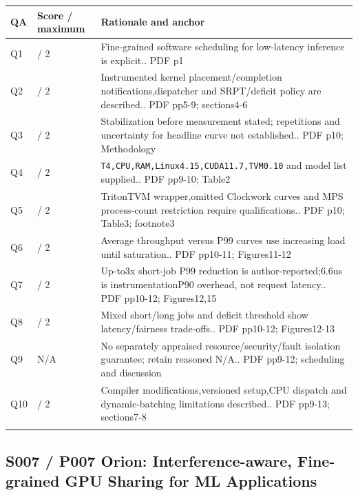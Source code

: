 \begin{longtable}{>{\raggedright\arraybackslash}p{}>{\raggedright\arraybackslash}p{}>{\raggedright\arraybackslash}p{}}
\toprule
\textbf{QA} & \textbf{Score / maximum} & \textbf{Rationale and anchor}\\\midrule\endhead
Q1 & 2 / 2 & Fine-grained software scheduling for low-latency inference is explicit.. PDF p1\\\addlinespace
Q2 & 2 / 2 & Instrumented kernel placement/completion notifications,dispatcher and SRPT/deficit policy are described.. PDF pp5-9; sections4-6\\\addlinespace
Q3 & 1 / 2 & Stabilization before measurement stated; repetitions and uncertainty for headline curve not established.. PDF p10; Methodology\\\addlinespace
Q4 & 2 / 2 & \nolinkurl{T4,CPU,RAM,Linux4.15,CUDA11.7,TVM0.10} and model list supplied.. PDF pp9-10; Table2\\\addlinespace
Q5 & 1 / 2 & TritonTVM wrapper,omitted Clockwork curves and MPS process-count restriction require qualifications.. PDF p10; Table3; footnote3\\\addlinespace
Q6 & 2 / 2 & Average throughput versus P99 curves use increasing load until saturation.. PDF pp10-11; Figures11-12\\\addlinespace
Q7 & 2 / 2 & Up-to3x short-job P99 reduction is author-reported;6.6us is instrumentationP90 overhead, not request latency.. PDF pp10-12; Figures12,15\\\addlinespace
Q8 & 2 / 2 & Mixed short/long jobs and deficit threshold show latency/fairness trade-offs.. PDF pp10-12; Figures12-13\\\addlinespace
Q9 & N/A & No separately appraised resource/security/fault isolation guarantee; retain reasoned N/A.. PDF pp9-12; scheduling and discussion\\\addlinespace
Q10 & 2 / 2 & Compiler modifications,versioned setup,CPU dispatch and dynamic-batching limitations described.. PDF pp9-13; sections7-8\\\addlinespace
\bottomrule\end{longtable}

\clearpage\subsection{S007 / P007 Orion: Interference-aware, Fine-grained GPU Sharing for ML Applications}

\cite{P007}

